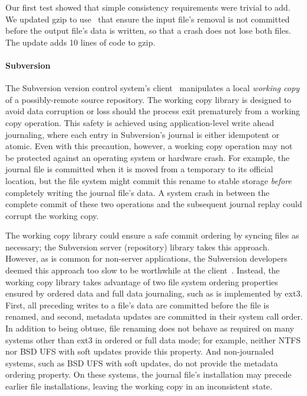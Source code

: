 Our first test showed that simple consistency requirements were trivial to
add.  We updated gzip to use \patchgroups\ that ensure the input file's
removal is not committed before the output file's data is written, so that
a crash does not lose both files. The update adds 10 lines of code to gzip.


\paragraph{Subversion}
\label{sec:patchgroup:svn}


The Subversion version control system's client~\cite{svn} manipulates a
local \emph{working copy} of a possibly-remote source repository.
%
The working copy library is designed to avoid data corruption or loss
should the process exit prematurely from a working copy operation.
%
This safety is achieved using application-level write ahead journaling,
where each entry in Subversion's journal is either idempotent or
atomic.
%
Even with this precaution, however, a working copy operation may not be
protected against an operating system or hardware crash.
%
For example, the journal file is committed when it is moved from a
temporary to its official location, but the file system might commit this
rename to stable storage \emph{before} completely writing the journal
file's data.
%
A system crash in between the complete commit of these two operations
and the subsequent journal replay could corrupt the working copy.

The working copy library could ensure a safe commit ordering by
syncing files as necessary; the Subversion server (repository) library
takes this approach.
%
However, as is common for non-server applications, the Subversion
developers deemed this approach too slow to be worthwhile at the
client~\cite{svntradeoff}.
%
Instead, the working copy library takes advantage of two file system
ordering properties ensured by ordered data and full data journaling, such
as is implemented by ext3.
%
First, all preceding writes to a file's data are committed before the file
is renamed,
%
and second, metadata updates are committed in their system call order.
%
%
In addition to being obtuse, file renaming does not behave
as required on many systems other than ext3 in ordered or full data
mode; for example, neither NTFS nor BSD UFS with soft updates provide
this property.
%
And non-journaled systems, such as BSD UFS with soft updates, do not
provide the metadata ordering property. On these systems, the journal
file's installation may precede earlier file installations, leaving the
working copy in an inconsistent state.

